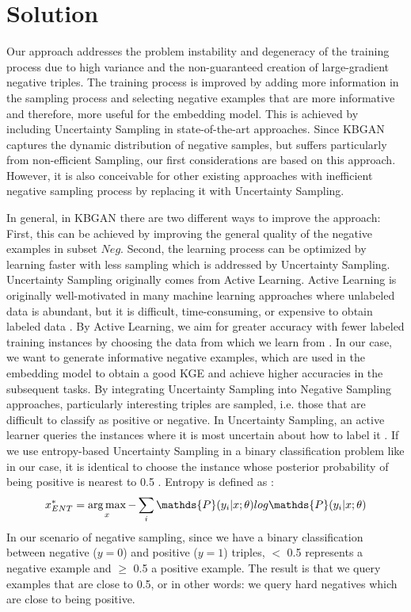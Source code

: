 \chapter{Solution}
\label{ch:solution}

Our approach addresses the problem instability and degeneracy of the training process due to high variance and the non-guaranteed creation of large-gradient negative triples.
The training process is improved by adding more information in the sampling process and selecting negative examples that are more informative and therefore, more useful for the embedding model.
This is achieved by including Uncertainty Sampling in state-of-the-art approaches.
Since \ac{KBGAN} captures the dynamic distribution of negative samples, but suffers particularly from non-efficient Sampling, our first considerations are based on this approach.
However, it is also conceivable for other existing approaches with inefficient negative sampling process by replacing it with Uncertainty Sampling.

In general, in \ac{KBGAN} there are two different ways to improve the approach:
First, this can be achieved by improving the general quality of the negative examples in subset $Neg$.
Second, the learning process can be optimized by learning faster with less sampling which is addressed by Uncertainty Sampling.
Uncertainty Sampling originally comes from Active Learning.
Active Learning is originally well-motivated in many machine learning approaches where unlabeled data is abundant, but it is difficult, time-consuming, or expensive to obtain labeled data \cite{Settles2009ActiveLL}.
By Active Learning, we aim for greater accuracy with fewer labeled training instances by choosing the data from which we learn from \cite{Settles2009ActiveLL}.
In our case, we want to generate informative negative examples, which are used in the embedding model to obtain a good \ac{KGE} and achieve higher accuracies in the subsequent tasks. 
By integrating Uncertainty Sampling into Negative Sampling approaches, particularly interesting triples are sampled, i.e. those that are difficult to classify as positive or negative. 
In Uncertainty Sampling, an active learner queries the instances where it is most uncertain about how to label it \cite{Settles2009ActiveLL}.
If we use entropy-based Uncertainty Sampling in a binary classification problem like in our case, it is identical to choose the instance whose posterior probability of being positive is nearest to 0.5 \cite{Settles2009ActiveLL}.
Entropy is defined as \cite{Settles2009ActiveLL}:
\begin{equation}
    x^{*}_{ENT} = \argmax_{x} - \sum_{i}{\mathds{P}(y_i | x; \theta) log \mathds{P}(y_i|x; \theta)}
\end{equation}
In our scenario of negative sampling, since we have a binary classification between negative ($y=0$) and positive ($y=1$) triples, $<$ 0.5 represents a negative example and $\geq$ 0.5 a positive example.
The result is that we query examples that are close to 0.5, or in other words: we query hard negatives which are close to being positive.

